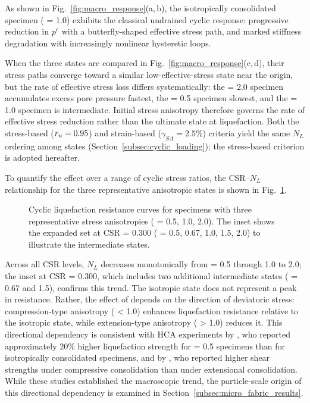 As shown in Fig.~\ref{fig:macro_response}(a,\,b), the isotropically consolidated specimen (\Kzero{} = 1.0) exhibits the classical undrained cyclic response: progressive reduction in $p^\prime$ with a butterfly-shaped effective stress path, and marked stiffness degradation with increasingly nonlinear hysteretic loops.

When the three \Kzero{} states are compared in Fig.~\ref{fig:macro_response}(c,\,d), their stress paths converge toward a similar low-effective-stress state near the origin, but the rate of effective stress loss differs systematically: the \Kzero{} = 2.0 specimen accumulates excess pore pressure fastest, the \Kzero{} = 0.5 specimen slowest, and the \Kzero{} = 1.0 specimen is intermediate. Initial stress anisotropy therefore governs the rate of effective stress reduction rather than the ultimate state at liquefaction. Both the stress-based ($r_u = 0.95$) and strain-based ($\gamma_{SA} = 2.5\%$) criteria yield the same $N_L$ ordering among \Kzero{} states (Section~\ref{subsec:cyclic_loading}); the stress-based criterion is adopted hereafter.

To quantify the \Kzero{} effect over a range of cyclic stress ratios, the CSR--$N_L$ relationship for the three representative anisotropic states is shown in Fig.~\ref{fig:liq_resistance_curves}.

\begin{figure}[t]
  \centering
  \caption{Cyclic liquefaction resistance curves for specimens with three representative stress anisotropies (\Kzero{} = 0.5, 1.0, 2.0). The inset shows the expanded \Kzero{} set at CSR = 0.300 (\Kzero{} = 0.5, 0.67, 1.0, 1.5, 2.0) to illustrate the intermediate states.}
  \label{fig:liq_resistance_curves}
\end{figure}

Across all CSR levels, $N_L$ decreases monotonically from \Kzero{} = 0.5 through 1.0 to 2.0; the inset at CSR = 0.300, which includes two additional intermediate states (\Kzero{} = 0.67 and 1.5), confirms this trend. The isotropic state does not represent a peak in resistance. Rather, the effect of \Kzero{} depends on the direction of deviatoric stress: compression-type anisotropy (\Kzero{} < 1.0) enhances liquefaction resistance relative to the isotropic state, while extension-type anisotropy (\Kzero{} > 1.0) reduces it. This directional dependency is consistent with HCA experiments by \citet{Vargas2020}, who reported approximately 20\% higher liquefaction strength for \Kzero{} = 0.5 specimens than for isotropically consolidated specimens, and by \citet{Zhao2024}, who reported higher shear strengths under compressive consolidation than under extensional consolidation. While these studies established the macroscopic trend, the particle-scale origin of this directional dependency is examined in Section~\ref{subsec:micro_fabric_results}.

